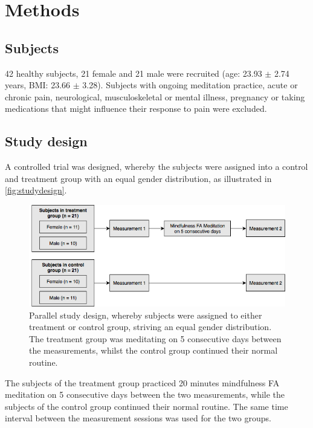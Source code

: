 \section{Methods}
\subsection{Subjects}
42 healthy subjects, 21 female and 21 male were recruited (age: 23.93 $\pm$ 2.74 years, BMI: 23.66 $\pm$ 3.28). Subjects with ongoing meditation practice, acute or chronic pain, neurological, musculoskeletal or mental illness, pregnancy or taking medications that might influence their response to pain were excluded.

\subsection{Study design}
A controlled trial was designed, whereby the subjects were assigned into a control and treatment group with an equal gender distribution, as illustrated in \autoref{fig:studydesign}.

\begin{figure}[H]
\centering
\includegraphics[width=1\columnwidth]{../figures/studydesign.png}
\caption{Parallel study design, whereby subjects were assigned to either treatment or control group, striving an equal gender distribution. The treatment group was meditating on 5 consecutive days between the measurements, whilst the control group continued their normal routine.}
\label{fig:studydesign}
\end{figure} 

\noindent 
The subjects of the treatment group practiced 20 minutes mindfulness FA meditation on 5 consecutive days between the two measurements, while the subjects of the control group continued their normal routine. The same time interval between the measurement sessions was used for the two groups.

